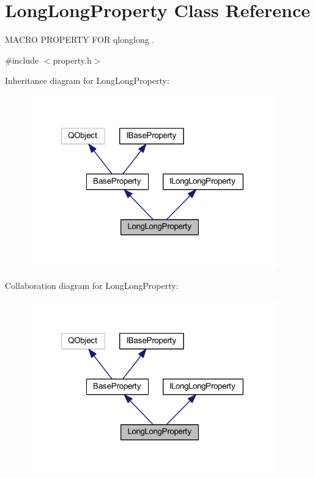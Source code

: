 \hypertarget{class_long_long_property}{\section{Long\-Long\-Property Class Reference}
\label{class_long_long_property}
}


M\-A\-C\-R\-O P\-R\-O\-P\-E\-R\-T\-Y F\-O\-R qlonglong .  




{\ttfamily \#include $<$property.\-h$>$}



Inheritance diagram for Long\-Long\-Property\-:
\nopagebreak
\begin{figure}[H]
\begin{center}
\leavevmode
\includegraphics[width=302pt]{class_long_long_property__inherit__graph}
\end{center}
\end{figure}


Collaboration diagram for Long\-Long\-Property\-:
\nopagebreak
\begin{figure}[H]
\begin{center}
\leavevmode
\includegraphics[width=302pt]{class_long_long_property__coll__graph}
\end{center}
\end{figure}
